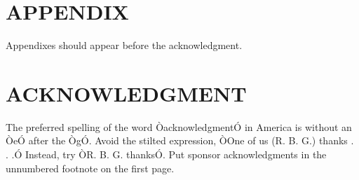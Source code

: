 \documentclass[letterpaper, 10 pt, conference]{ieeeconf}  %
\begin{document}



\section*{APPENDIX}

Appendixes should appear before the acknowledgment.

\section*{ACKNOWLEDGMENT}

The preferred spelling of the word ÒacknowledgmentÓ in America is without an ÒeÓ after the ÒgÓ. Avoid the stilted expression, ÒOne of us (R. B. G.) thanks . . .Ó  Instead, try ÒR. B. G. thanksÓ. Put sponsor acknowledgments in the unnumbered footnote on the first page.






\end{document}

